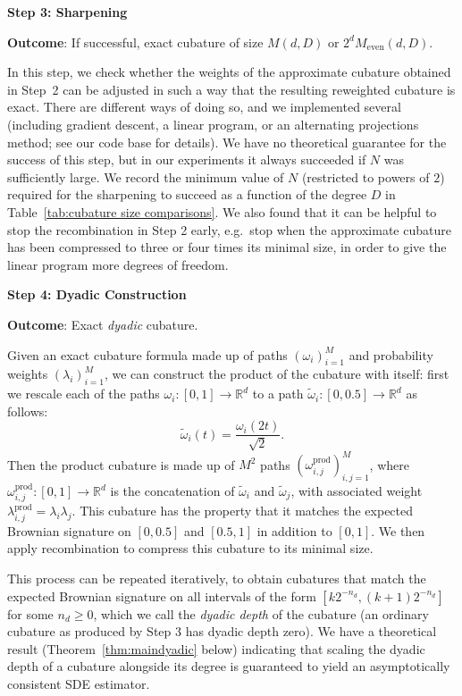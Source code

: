 \documentclass[11pt, letterpaper]{article}
\theoremstyle{definition}
\theoremstyle{remark}
\newcommand{\R}{\mathbb{R}}
\begin{document}
\medskip\textbf{Step 3: Sharpening}

\par\noindent\textbf{Outcome}: If successful, exact cubature of size $M(d,D)$ or $2^d M_\text{even}(d,D)$.

In this step, we check whether the weights of the approximate cubature obtained in Step~2 can be adjusted in such a way that the resulting reweighted cubature is exact. There are different ways of doing so, and we implemented several (including gradient descent, a linear program, or an alternating projections method; see our code base for details). We have no theoretical guarantee for the success of this step, but in our experiments it always succeeded if $N$ was sufficiently large. We record the minimum value of $N$ (restricted to powers of $2$) required for the sharpening to succeed as a function of the degree $D$ in Table~\ref{tab:cubature size comparisons}. We also found that it can be helpful to stop the recombination in Step 2 early, e.g.\ stop when the approximate cubature has been compressed to three or four times its minimal size, in order to give the linear program more degrees of freedom.

\medskip\textbf{Step 4: Dyadic Construction}

\par\noindent\textbf{Outcome}: Exact \emph{dyadic} cubature.

Given an exact cubature formula made up of paths $(\omega_i)_{i=1}^M$ and probability weights $(\lambda_i)_{i=1}^M$, we can construct the product of the cubature with itself: first we rescale each of the paths $\omega_i \colon [0,1]\to \R^d$ to a path $\tilde{\omega}_i\colon [0,0.5] \to \R^d$ as follows: \[
\tilde{\omega}_i(t) = \frac{ \omega_i(2t)}{\sqrt{2}}.
\]
Then the product cubature is made up of $M^2$ paths $(\omega^\text{prod}_{i,j})_{i,j=1}^M$, where $\omega^\text{prod}_{i,j}\colon [0,1]\to \R^d$ is the concatenation of $\tilde{\omega}_i$ and $\tilde{\omega}_j$, with associated weight $\lambda_{i,j}^\text{prod} = \lambda_i \lambda_j$. This cubature has the property that it matches the expected Brownian signature on $[0,0.5]$ and $[0.5,1]$ in addition to $[0,1]$. We then apply recombination to compress this cubature to its minimal size.

This process can be repeated iteratively, to obtain cubatures that match the expected Brownian signature on all intervals of the form $[k2^{-n_d},(k+1)2^{-n_d}]$ for some $n_d\ge 0$, which we call the \emph{dyadic depth} of the cubature (an ordinary cubature as produced by Step 3 has dyadic depth zero). We have a theoretical result (Theorem~\ref{thm:maindyadic} below) indicating that scaling the dyadic depth of a cubature alongside its degree is guaranteed to yield an asymptotically consistent SDE estimator.
\end{document}
